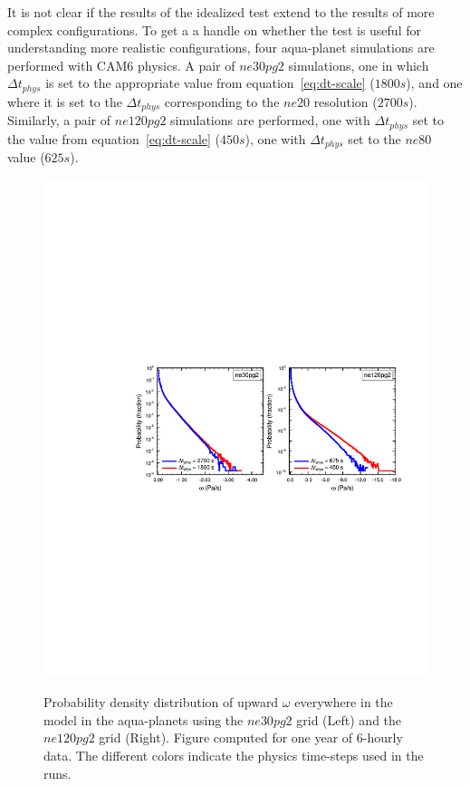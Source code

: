 \documentclass{agujournal}
\begin{document}
It is not clear if the results of the idealized test extend to the results of more complex configurations. To get a a handle on whether the test is useful for understanding more realistic configurations, four aqua-planet simulations are performed with CAM6 physics. A pair of $ne30pg2$ simulations, one in which $\Delta t_{phys}$ is set to the appropriate value from equation~\ref{eq:dt-scale} ($1800s$), and one where it is set to the $\Delta t_{phys}$ corresponding to the $ne20$ resolution ($2700s$). Similarly, a pair of $ne120pg2$ simulations are performed, one with $\Delta t_{phys}$ set to the value from equation~\ref{eq:dt-scale} ($450s$), one with $\Delta t_{phys}$ set to the $ne80$ value ($625s$). 

\begin{figure}[t]
\begin{center}
\noindent\includegraphics[width=30pc,angle=0]{figs/panel_pdf_dtphys.pdf}\\
\end{center}
\caption{Probability density distribution of upward $\omega$ everywhere in the model in the aqua-planets using the $ne30pg2$ grid (Left) and the $ne120pg2$ grid (Right). Figure computed for one year of 6-hourly data. The different colors indicate the physics time-steps used in the runs.}
\label{fig:pdf-dtphys}
\end{figure}
\end{document}
